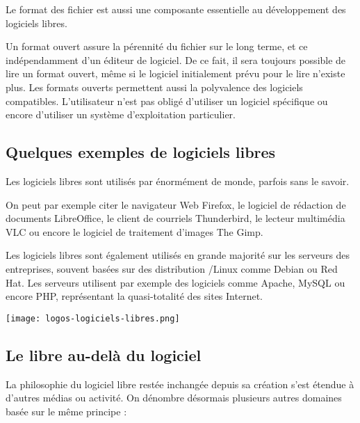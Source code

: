 Le format des fichier est aussi une composante essentielle au développement des logiciels libres.

Un \textcolor{Cdl}{format ouvert} assure la pérennité du fichier sur le long terme, et ce indépendamment d’un éditeur de logiciel. De ce fait, il sera toujours possible de lire un format ouvert, même si le logiciel initialement prévu pour le lire n’existe plus. Les formats ouverts permettent aussi la polyvalence des logiciels compatibles. L’utilisateur n’est pas obligé d’utiliser un logiciel spécifique ou encore d’utiliser un système d’exploitation particulier.

\subsection{Quelques exemples de logiciels libres}

\begin{minipage}{0.7\textwidth}
Les logiciels libres sont utilisés par énormément de monde, parfois 
sans le savoir.

On peut par exemple citer le navigateur Web \textcolor{Cdl}{Firefox}, 
le logiciel de rédaction de documents \textcolor{Cdl}{LibreOffice}, le 
client de courriels \textcolor{Cdl}{Thunderbird}, le lecteur 
multimédia \textcolor{Cdl}{VLC} ou encore le logiciel de traitement 
d’images \textcolor{Cdl}{The Gimp}.

\Separateur

Les logiciels libres sont également utilisés en grande majorité sur 
les serveurs des entreprises, souvent basées sur des distribution 
/Linux comme \textcolor{Cdl}{Debian} ou 
\textcolor{Cdl}{Red\,Hat}. Les serveurs utilisent par exemple des 
logiciels comme \textcolor{Cdl}{Apache}, \textcolor{Cdl}{MySQL} ou 
encore \textcolor{Cdl}{PHP}, représentant la quasi-totalité des sites 
Internet.
\end{minipage}
\begin{minipage}{0.3\textwidth}
\begin{center}
\texttt{[image: logos-logiciels-libres.png]}
\end{center}
\end{minipage}

\subsection{Le libre au-delà du logiciel}

La philosophie du logiciel libre restée inchangée depuis sa création 
s’est étendue à d’autres médias ou activité. On dénombre désormais plusieurs 
autres domaines basée sur le même principe :

